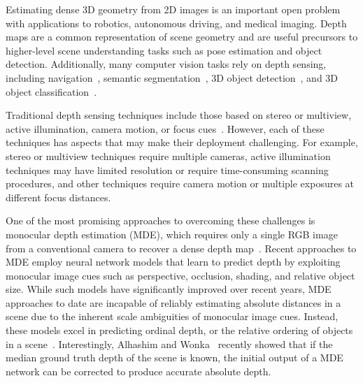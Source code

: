 Estimating dense 3D geometry from 2D images is an important open problem with applications to robotics, autonomous driving, and medical imaging. Depth maps are a common representation of scene geometry and are useful precursors to higher-level scene understanding tasks such as pose estimation and object detection. Additionally, many computer vision tasks rely on depth sensing, including navigation~\cite{geiger2013vision}, semantic segmentation~\cite{gupta2013perceptual,ren2012rgb,silberman2012indoor}, 3D object detection~\cite{gupta2014learning,lin2013holistic,shrivastava2013building,song2014sliding,song2016deep}, and 3D object classification~\cite{maturana2015voxnet,qi2016volumetric,wu20153d}. 

Traditional depth sensing techniques include those based on stereo or multiview, active illumination, camera motion, or focus cues~\cite{szeliski2010computer}. However, each of these techniques has aspects that may make their deployment challenging. For example, stereo or multiview techniques require multiple cameras, active illumination techniques may have limited resolution or require time-consuming scanning procedures, and other techniques require camera motion or multiple exposures at different focus distances.

One of the most promising approaches to overcoming these challenges is monocular depth estimation (MDE), which requires only a single RGB image from a conventional camera to recover a dense depth map~\cite{Alhashim2018,Eigen2014,Fu2018,Laina2016,Saxena2006}. Recent approaches to MDE employ neural network models that learn to predict depth by exploiting monocular image cues such as perspective, occlusion, shading, and relative object size. While such models have significantly improved over recent years, MDE approaches to date are incapable of reliably estimating absolute distances in a scene due to the inherent scale ambiguities of monocular image cues. Instead, these models excel in predicting ordinal depth, or the relative ordering of objects in a scene~\cite{Eigen2014,Fu2018}. Interestingly, Alhashim and Wonka~\cite{Alhashim2018} recently showed that if the median ground truth depth of the scene is known, the initial output of a MDE network can be corrected to produce accurate absolute depth.


